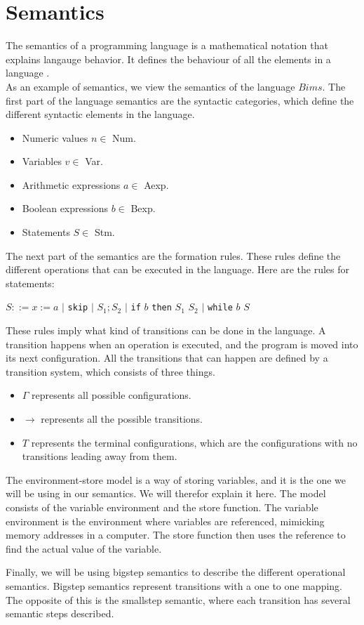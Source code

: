 \section{Semantics}
\label{sec:semantics}

The semantics of a programming language is a mathematical notation that explains langauge behavior. 
It defines the behaviour of all the elements in a language \cite{misc:sem}.\\ \indent
As an example of semantics, we view the semantics of the language $Bims$. 
The first part of the language semantics are the syntactic categories, which define the different syntactic elements in the language.

\begin{itemize}
\item Numeric values $n \in$ Num.
\item Variables $v \in$ Var.
\item Arithmetic expressions $a \in$ Aexp.
\item Boolean expressions $b \in$ Bexp.
\item Statements $S \in$ Stm.
\end{itemize}

The next part of the semantics are the formation rules. 
These rules define the different operations that can be executed in the language. 
Here are the rules for statements: \newline

$S ::= x := a$ $|$ \texttt{skip} $|$ $S_1;S_2$ $|$ \texttt{if} $b$ \texttt{then} $S_1$  $S_2$ $|$ \texttt{while} $b$  $S$\newline

These rules imply what kind of transitions can be done in the language. 
A transition happens when an operation is executed, and the program is moved into its next configuration. 
All the transitions that can happen are defined by a transition system, which consists of three things. 

\begin{itemize}
\item $\Gamma$ represents all possible configurations. 
\item $\rightarrow$ represents all the possible transitions.
\item $T$ represents the terminal configurations, which are the configurations with no transitions leading away from them.
\end{itemize}

The environment-store model is a way of storing variables, and it is the one we will be using in our semantics. 
We will therefor explain it here. \newline
The model consists of the variable environment and the store function. 
The variable environment is the environment where variables are referenced, mimicking memory addresses in a computer. 
The store function then uses the reference to find the actual value of the variable. \newline

Finally, we will be using bigstep semantics to describe the different operational semantics. 
Bigstep semantics represent transitions with a one to one mapping. 
The opposite of this is the smallstep semantic, where each transition has several semantic steps described.